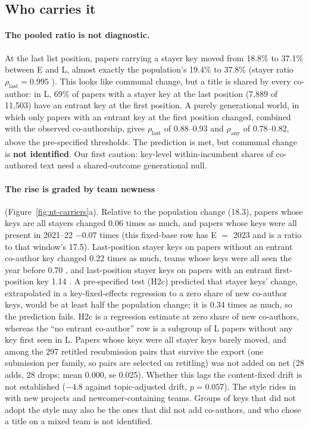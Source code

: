 \subsection{Who carries it}
\label{sec:nt-carriers}

\paragraph{The pooled ratio is not diagnostic.}
At the last list position, papers carrying a stayer key moved from 18.8\% to 37.1\% \NAME{} between E and L, almost exactly the population's 19.4\% to 37.8\% (stayer ratio $\rho_{\text{last}}=0.995$ ). This looks like communal change, but a title is shared by every co-author: in L, 69\% of papers with a stayer key at the last position (7,889 of 11,503) have an entrant key at the first position. A purely generational world, in which only papers with an entrant key at the first position changed, combined with the observed co-authorship, gives $\rho_{\text{last}}$ of 0.88--0.93 and $\rho_{\text{any}}$ of 0.78--0.82, above the pre-specified thresholds. The prediction is met, but communal change is \textbf{not identified}. Our first caution: key-level within-incumbent shares of co-authored text need a shared-outcome generational null.

\paragraph{The rise is graded by team newness} (Figure~\ref{fig:nt-carriers}a).
Relative to the population change (18.3\pp), papers whose keys are all stayers changed 0.06  times as much, and papers whose keys were all present in 2021--22 $-0.07$  times (this fixed-base row has E $=$ 2023 and is a ratio to that window's 17.5\pp). Last-position stayer keys on papers without an entrant co-author key changed 0.22  times as much, teams whose keys were all seen the year before 0.70 , and last-position stayer keys on papers with an entrant first-position key 1.14 . A pre-specified test (H2c) predicted that stayer keys' change, extrapolated in a key-fixed-effects regression to a zero share of new co-author keys, would be at least half the population change; it is 0.34  times as much, so the prediction fails. H2c is a regression estimate at zero share of new co-authors, whereas the ``no entrant co-author'' row is a subgroup of L papers without any key first seen in L. Papers whose keys were all stayer keys barely moved, and among the 297 retitled resubmission pairs that survive the export (one submission per family, so pairs are selected on retitling) \NAME{} was not added on net (28 adds, 28 drops; mean 0.000, se 0.025). Whether this lags the content-fixed drift is not established ($-4.8$\pp{} against topic-adjusted drift, $p=0.057$). The style rides in with new projects and newcomer-containing teams. Groups of keys that did not adopt the style may also be the ones that did not add co-authors, and who chose a title on a mixed team is not identified.

